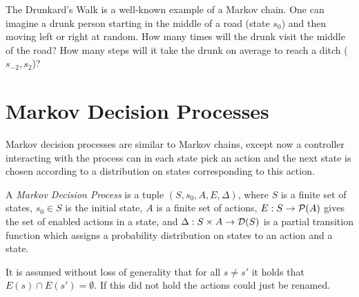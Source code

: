 \begin{example} The Drunkard's Walk is a well-known example of a Markov
    chain. One can imagine a drunk person starting in the middle of a road
    (state $s_0$) and then moving left or right at random. How many times
    will the drunk visit the middle of the road? How many steps will it
    take the drunk on average to reach a ditch ($s_{-2}, s_2$)?

\hfill \break
\centering
{}
\end{example}

\section{Markov Decision Processes}

Markov decision processes are similar to Markov chains, except now a
controller interacting with the process can in each state pick an action
and the next state is chosen according to a distribution on states
corresponding to this action.

\begin{definition}
A {\em Markov Decision Process} is a tuple $(S, s_0, A, E, \Delta)$, where
$S$ is a finite set of states,
$s_0 \in S$ is the initial state,
$A$ is a finite set of actions,
$E : S \to \mathcal{P}(A)$ gives the set of enabled actions in a state,
and $\Delta : S \times A \to \mathcal{D}(S)$ is a partial transition
function which assigns a probability distribution on states to an action
and a state.

It is assumed without loss of generality that for all $s \neq s'$ it
holds that $E(s) \cap E(s') = \emptyset$. If this did not hold the
actions could just be renamed.
\end{definition}

